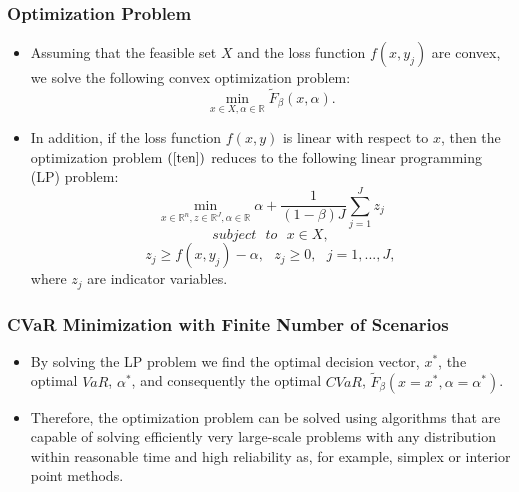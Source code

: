\documentclass[pdf,10pt,xcolor=dvipsnames,hide notes]{beamer}
\begin{document}
\begin{frame}[label=frame2b8]
	\frametitle{Optimization Problem}
	
	\begin{itemize}
		\justifying
		
		\item Assuming that the feasible set $X$ and the loss
		function $f(x,y_{j})$ are convex, we solve the following convex optimization problem:
		\begin{equation}
		\underset{x\in X,\alpha \in
			\mathbb{R}
		}{\min }\widetilde{F}_{\beta }\left( x,\alpha \right) .  \label{ten}
		\end{equation}
		
		\vspace{0.3cm}
		
		\item In addition, if the loss function $f(x,y)$ is linear with respect to
		\thinspace $x$, then the optimization problem $\left( \ref{ten}\right) $
		reduces to the following linear programming (LP) problem:%
		\begin{equation}
		\underset{x\in
			\mathbb{R}
			^{n},z\in
			\mathbb{R}
			^{J},\alpha \in
			\mathbb{R}
		}{\min }\alpha +\frac{1}{\left( 1-\beta \right) J}\sum_{j=1}^{J}z_{j}
		\label{eleven}
		\end{equation}%
		\begin{equation}
		subject\text{ } to\text{ }x\in X,  \label{12}
		\end{equation}
		\begin{equation}
		z_{j}\geq f(x,y_{j})-\alpha ,\text{ }z_{j}\geq 0,\text{ }j=1,...,J,
		\label{13}
		\end{equation}
		where $z_{j}$ are indicator variables. 
		
	\end{itemize}
	
\end{frame}

\begin{frame}[label=frame2b9]
	\frametitle{CVaR Minimization with Finite Number of Scenarios}
	
	\begin{itemize}
		\justifying
		
		\item By solving the LP problem we
		find the optimal decision vector, $x^{\ast }$, the optimal $VaR$, $\alpha
		^{\ast }$, and consequently the optimal $CVaR$, $\widetilde{F}_{\beta
		}\left( x=x^{\ast },\alpha=\alpha ^{\ast }\right) $.
	
	\vspace{0.3cm}
	
	\item Therefore, the optimization problem can be solved using algorithms that are
	capable of solving efficiently very large-scale problems with any
	distribution within reasonable time and high reliability as, for example,
	simplex or interior point methods.
	
		
	\end{itemize}
	
\end{frame}
\end{document}

